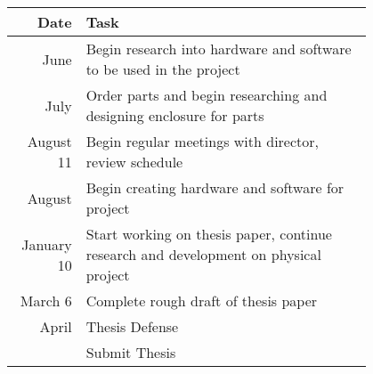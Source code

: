 \documentclass[11pt]{article}
\begin{document}
\begin{tabular}{r|p{0.8\linewidth}}
	Date       & Task                                                                                 \\
	\hline
	June       & Begin research into hardware and software to be used in the project                  \\
	July       & Order parts and begin researching and designing enclosure for parts                  \\
	August 11  & Begin regular meetings with director, review schedule                                \\
	August     & Begin creating hardware and software for project                                     \\
	January 10 & Start working on thesis paper, continue research and development on physical project \\
	March 6    & Complete rough draft of thesis paper                                                 \\
	April      & Thesis Defense                                                                       \\
	           & Submit Thesis                                                                        \\
\end{tabular}
\end{document}
